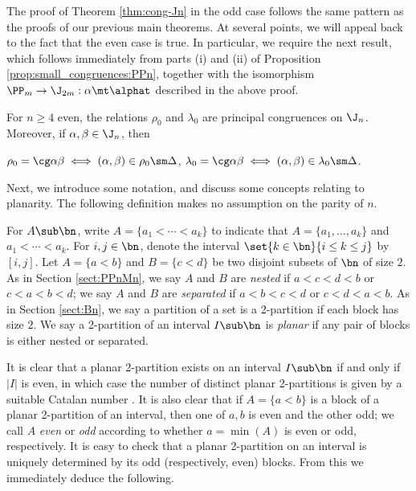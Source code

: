 The proof of Theorem \ref{thm:cong-Jn} in the odd case follows the same pattern as the proofs of our previous main theorems.  At several points, we will appeal back to the fact that the even case is true.  In particular, we require the next result, which follows immediately from parts (i) and (ii) of Proposition \ref{prop:small_congruences:PPn}, together with the isomorphism $\PP_m\to\J_{2m}:\alpha\mt\alphat$ described in the above proof.

\newpage

\begin{proposition}
\label{prop:rlJeven}
For $n\geq4$ even, the relations $\rho_0$ and $\lambda_0$ are principal congruences on $\J_n$.  Moreover, if $\alpha,\beta\in\J_n$, then
\begin{itemize}\begin{multicols}{2}
 $\rho_0=\cg\alpha\beta\iff (\alpha,\beta)\in\rho_0\sm\Delta$, 
 $\lambda_0=\cg\alpha\beta\iff (\alpha,\beta)\in\lambda_0\sm\Delta$.
\epfres
\end{multicols}\end{itemize}
\end{proposition}



Next, we introduce some notation, and discuss some concepts relating to planarity.  The following definition makes no assumption on the parity of $n$.

\begin{definition}
For $A\sub\bn$, write $A=\{a_1<\cdots<a_k\}$ to indicate that $A=\{a_1,\ldots,a_k\}$ and $a_1<\cdots<a_k$.  For $i,j\in\bn$, denote the interval $\set{k\in\bn}{i\leq k\leq j}$ by~$[i,j]$.  
%
Let $A=\{a<b\}$ and $B=\{c<d\}$ be two disjoint subsets of $\bn$ of size $2$.  As in Section \ref{sect:PPnMn}, we say $A$ and $B$ are \emph{nested} if $a<c<d<b$ or $c<a<b<d$; we say $A$ and $B$ are \emph{separated} if $a<b<c<d$ or $c<d<a<b$.  As in Section \ref{sect:Bn}, we say a partition of a set is a 2-partition if each block has size $2$.  We say a 2-partition of an interval $I\sub\bn$ is \emph{planar} if any pair of blocks is either nested or separated.  
\end{definition}


It is clear that a planar 2-partition exists on an interval $I\sub\bn$ if and only if $|I|$ is even, in which case the number of distinct planar 2-partitions is given by a suitable Catalan number \cite[Sequence A000108]{OEIS}.  
It is also clear that if $A=\{a<b\}$ is a block of a planar 2-partition of an interval, then one of $a,b$ is even and the other odd;
%
we call $A$ \emph{even} or \emph{odd} according to whether $a=\min(A)$ is even or odd, respectively.
It is easy to check that a planar 2-partition on an interval is uniquely determined by its odd (respectively, even) blocks. 
%
From this we immediately deduce the following.



